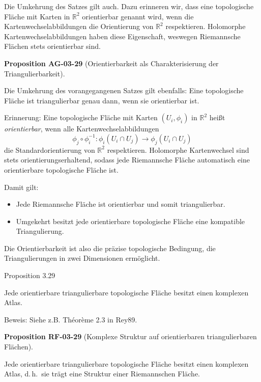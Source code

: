 \documentclass[10pt, letterpaper]{article}
\newcommand{\CustomHeading}[3]{%
  \par\medskip\noindent%
  \textbf{#1 #2} \textnormal{(#3)}.\enskip%
}
\newenvironment{PROP}[2]{\begin{unitbox}\CustomHeading{Proposition}{#1}{#2}}{\end{unitbox}}
\begin{document}
Die Umkehrung des Satzes gilt auch. Dazu erinneren wir, dass eine topologische Fläche mit Karten in $\mathbb{R}^{2}$ orientierbar genannt wird, wenn die Kartenwechselabbildungen die Orientierung von $\mathbb{R}^{2}$ respektieren. Holomorphe Kartenwechselabbildungen haben diese Eigenschaft, weswegen Riemannsche Flächen stets orientierbar sind.


\begin{PROP}{AG-03-29}{Orientierbarkeit als Charakterisierung der Triangulierbarkeit}
Die Umkehrung des vorangegangenen Satzes gilt ebenfalls:  
Eine topologische Fläche ist triangulierbar genau dann, wenn sie
orientierbar ist.

\medskip

\noindent
Erinnerung:  
Eine topologische Fläche mit Karten $(U_i,\phi_i)$ in $\mathbb{R}^2$
heißt \emph{orientierbar}, wenn alle Kartenwechselabbildungen
\[
\phi_j\circ \phi_i^{-1} : \phi_i(U_i\cap U_j)\longrightarrow \phi_j(U_i\cap U_j)
\]
die Standardorientierung von $\mathbb{R}^2$ respektieren.  
Holomorphe Kartenwechsel sind stets orientierungserhaltend, sodass
jede Riemannsche Fläche automatisch eine orientierbare
topologische Fläche ist.

\medskip

\noindent
Damit gilt:
\begin{itemize}
  \item Jede Riemannsche Fläche ist orientierbar und somit triangulierbar.
  \item Umgekehrt besitzt jede orientierbare topologische Fläche eine
        kompatible Triangulierung.
\end{itemize}

\medskip

\noindent
Die Orientierbarkeit ist also die präzise topologische Bedingung, die
Triangulierungen in zwei Dimensionen ermöglicht.
\end{PROP}

Proposition 3.29 

Jede orientierbare triangulierbare topologische Fläche besitzt einen komplexen Atlas.


Beweis: Siehe z.B. Théorème 2.3 in Rey89.


\begin{PROP}{RF-03-29}{Komplexe Struktur auf orientierbaren triangulierbaren Flächen}
Jede orientierbare triangulierbare topologische Fläche besitzt einen komplexen Atlas, d.\,h.\ sie trägt eine Struktur einer Riemannschen Fläche.
\end{PROP}
\end{document}
